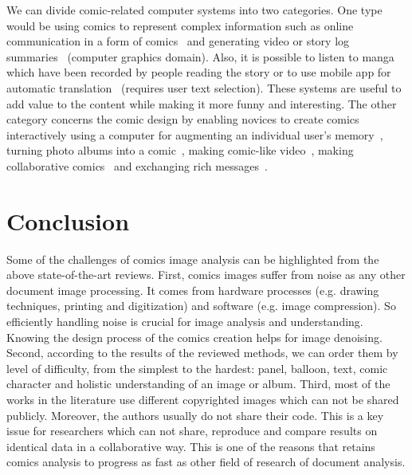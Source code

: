 We can divide comic-related computer systems into two categories.
One type would be using comics to represent complex information such as online communication in a form of comics~\cite{Kurlander1996} and generating video or story log summaries~\cite{Uchihashi1999Video,Alves2008So,Shamir2006Generating} (computer graphics domain).
Also, it is possible to listen to manga~\cite{Vomic} which have been recorded by people reading the story or to use mobile app for automatic translation~\cite{OCRMangaReader,Capture2Text} (requires user text selection).
These systems are useful to add value to the content while making it more funny and interesting.
The other category concerns the comic design by enabling novices to create comics  interactively using a computer for augmenting an individual user's memory~\cite{SumiSNM2002Comic}, turning photo albums into a comic~\cite{ComicLife3,Chu2013Optimized}, making comic-like video~\cite{Raulet2011Sketch}, making collaborative comics~\cite{Ricardo2009Calligraphic} and exchanging rich messages~\cite{Salovaara2007Appropriation}.




\section{Conclusion}
\label{sec:sota:conclusion}




Some of the challenges of comics image analysis can be highlighted from the above state-of-the-art reviews.
First, comics images suffer from noise as any other document image processing.
It comes from hardware processes (e.g. drawing techniques, printing and digitization) and software (e.g. image compression).
So efficiently handling noise is crucial for image analysis and understanding.
Knowing the design process of the comics creation helps for image denoising.
Second, according to the results of the reviewed methods, we can order them by level of difficulty, from the simplest to the hardest: panel, balloon, text, comic character and holistic understanding of an image or album.
Third, most of the works in the literature use different copyrighted images which can not be shared publicly.
Moreover, the authors usually do not share their code.
This is a key issue for researchers which can not share, reproduce and compare results on identical data in a collaborative way.
This is one of the reasons that retains comics analysis to progress as fast as other field of research of document analysis.

